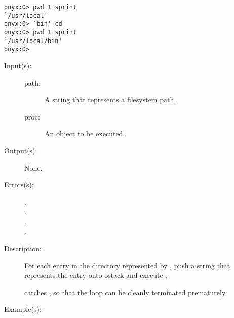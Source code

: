 \begin{description}
\begin{description}
\begin{verbatim}
onyx:0> pwd 1 sprint
`/usr/local'
onyx:0> `bin' cd
onyx:0> pwd 1 sprint
`/usr/local/bin'
onyx:0>
		\end{verbatim}
	\end{description}
\label{systemdict:dirforeach}
\item[{\onyxop{path proc}{dirforeach}{--}}: ]
	\begin{description}\item[]
	\item[Input(s): ]
		\begin{description}\item[]
		\item[path: ]
			A string that represents a filesystem path.
		\item[proc: ]
			An object to be executed.
		\end{description}
	\item[Output(s): ] None.
	\item[Errors(s): ]
		\begin{description}\item[]
		\item[.]
		\item[.]
		\item[.]
		\item[.]
		\end{description}
	\item[Description: ]
		For each entry in the directory represented by ,
		push a string that represents the entry onto ostack and
		execute .

		 catches , so that the
		loop can be cleanly terminated prematurely.
	\item[Example(s): ]\begin{verbatim}


\end{verbatim}
\end{description}
\end{description}
